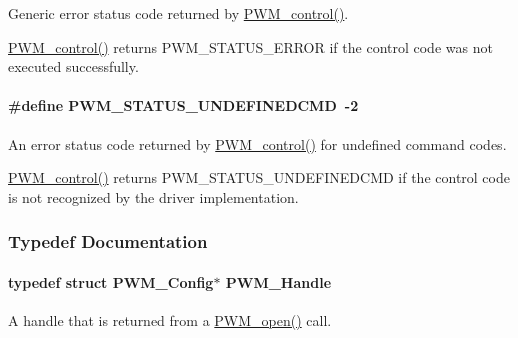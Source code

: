 Generic error status code returned by \hyperlink{_p_w_m_8h_ade999f5b12997479efa1ac85aaf46ef5}{P\+W\+M\+\_\+control()}. 

\hyperlink{_p_w_m_8h_ade999f5b12997479efa1ac85aaf46ef5}{P\+W\+M\+\_\+control()} returns P\+W\+M\+\_\+\+S\+T\+A\+T\+U\+S\+\_\+\+E\+R\+R\+O\+R if the control code was not executed successfully. 
\paragraph[{P\+W\+M\+\_\+\+S\+T\+A\+T\+U\+S\+\_\+\+U\+N\+D\+E\+F\+I\+N\+E\+D\+C\+M\+D}]{\setlength{\rightskip}{0pt plus 5cm}\#define P\+W\+M\+\_\+\+S\+T\+A\+T\+U\+S\+\_\+\+U\+N\+D\+E\+F\+I\+N\+E\+D\+C\+M\+D~-\/2}\label{_p_w_m_8h_afed58384f49ce364218eeaabb0858bea}


An error status code returned by \hyperlink{_p_w_m_8h_ade999f5b12997479efa1ac85aaf46ef5}{P\+W\+M\+\_\+control()} for undefined command codes. 

\hyperlink{_p_w_m_8h_ade999f5b12997479efa1ac85aaf46ef5}{P\+W\+M\+\_\+control()} returns P\+W\+M\+\_\+\+S\+T\+A\+T\+U\+S\+\_\+\+U\+N\+D\+E\+F\+I\+N\+E\+D\+C\+M\+D if the control code is not recognized by the driver implementation. 

\subsubsection{Typedef Documentation}
\paragraph[{P\+W\+M\+\_\+\+Handle}]{\setlength{\rightskip}{0pt plus 5cm}typedef struct {\bf P\+W\+M\+\_\+\+Config}$\ast$ {\bf P\+W\+M\+\_\+\+Handle}}\label{_p_w_m_8h_afdefc765f42bbad4dca246fda6e1354b}


A handle that is returned from a \hyperlink{_p_w_m_8h_ac963beab0c5c6901bf852f175028aeaf}{P\+W\+M\+\_\+open()} call. 

